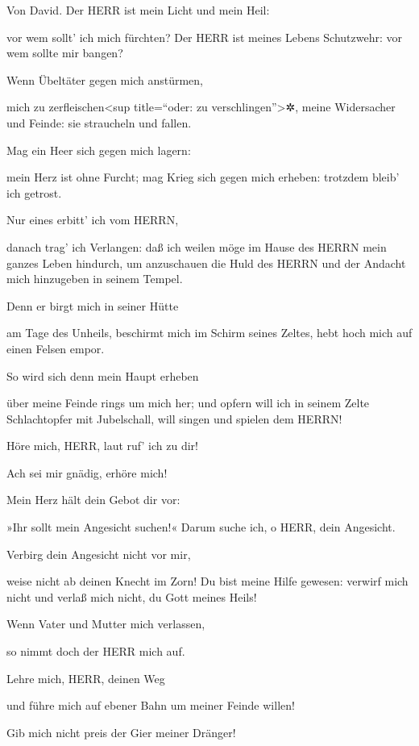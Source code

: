Von David. Der HERR ist mein Licht und mein Heil:

vor wem sollt' ich mich fürchten? Der HERR ist meines Lebens Schutzwehr:
vor wem sollte mir bangen?

Wenn Übeltäter gegen mich anstürmen,

mich zu zerfleischen\textless sup title=``oder: zu
verschlingen''\textgreater✲, meine Widersacher und Feinde: sie
straucheln und fallen.

Mag ein Heer sich gegen mich lagern:

mein Herz ist ohne Furcht; mag Krieg sich gegen mich erheben: trotzdem
bleib' ich getrost.

Nur eines erbitt' ich vom HERRN,

danach trag' ich Verlangen: daß ich weilen möge im Hause des HERRN mein
ganzes Leben hindurch, um anzuschauen die Huld des HERRN und der Andacht
mich hinzugeben in seinem Tempel.

Denn er birgt mich in seiner Hütte

am Tage des Unheils, beschirmt mich im Schirm seines Zeltes, hebt hoch
mich auf einen Felsen empor.

So wird sich denn mein Haupt erheben

über meine Feinde rings um mich her; und opfern will ich in seinem Zelte
Schlachtopfer mit Jubelschall, will singen und spielen dem HERRN!

Höre mich, HERR, laut ruf' ich zu dir!

Ach sei mir gnädig, erhöre mich!

Mein Herz hält dein Gebot dir vor:

»Ihr sollt mein Angesicht suchen!« Darum suche ich, o HERR, dein
Angesicht.

Verbirg dein Angesicht nicht vor mir,

weise nicht ab deinen Knecht im Zorn! Du bist meine Hilfe gewesen:
verwirf mich nicht und verlaß mich nicht, du Gott meines Heils!

Wenn Vater und Mutter mich verlassen,

so nimmt doch der HERR mich auf.

Lehre mich, HERR, deinen Weg

und führe mich auf ebener Bahn um meiner Feinde willen!

Gib mich nicht preis der Gier meiner Dränger!


